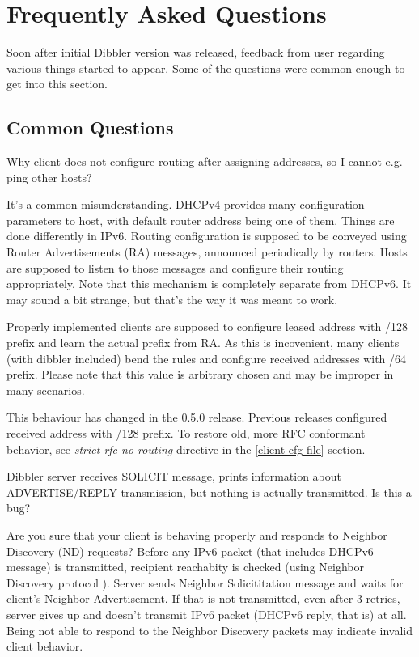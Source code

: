 
\section{Frequently Asked Questions}

Soon after initial Dibbler version was released, feedback from user
regarding various things started to appear. Some of the questions were
common enough to get into this section.

\subsection{Common Questions}

\Q Why client does not configure routing after assigning addresses, so
I cannot e.g. ping other hosts?

\A It's a common misunderstanding. DHCPv4 provides many configuration
parameters to host, with default router address being one of
them. Things are done differently in IPv6. Routing configuration is
supposed to be conveyed using Router Advertisements (RA) messages,
announced periodically by routers. Hosts are supposed to listen to
those messages and configure their routing appropriately. Note that
this mechanism is completely separate from DHCPv6. It may sound a bit
strange, but that's the way it was meant to work. 

Properly implemented clients are supposed to configure leased address
with /128 prefix and learn the actual prefix from RA. As this is
incovenient, many clients (with dibbler included) bend the rules and
configure received addresses with /64 prefix. Please note that this
value is arbitrary chosen and may be improper in many scenarios. 

\Note This behaviour has changed in the 0.5.0 release. Previous
releases configured received address with /128 prefix. To restore old,
more RFC conformant behavior, see \emph{strict-rfc-no-routing}
directive in the \ref{client-cfg-file} section.

\vspace{0.5cm}
\Q Dibbler server receives SOLICIT message, prints information about
ADVERTISE/REPLY transmission, but nothing is actually transmitted. Is
this a bug?

\A Are you sure that your client is behaving properly and responds to
Neighbor Discovery (ND) requests? Before any IPv6 packet (that
includes DHCPv6 message) is transmitted, recipient reachabity is
checked (using Neighbor Discovery protocol \cite{rfc4861}). Server
sends Neighbor Solicititation message and waits for client's Neighbor
Advertisement. If that is not transmitted, even after 3 retries,
server gives up and doesn't transmit IPv6 packet (DHCPv6 reply, that
is) at all. Being not able to respond to the Neighbor Discovery
packets may indicate invalid client behavior.

